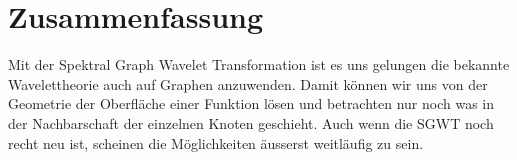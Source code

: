 
\section{Zusammenfassung\label{sec:sgwt:summary}}

Mit der Spektral Graph Wavelet Transformation ist es uns gelungen die bekannte 
Wavelettheorie auch auf Graphen anzuwenden. Damit k\"onnen wir uns von der 
Geometrie der Oberfl\"ache einer Funktion l\"osen und betrachten nur noch was 
in der Nachbarschaft der einzelnen Knoten geschieht. Auch wenn die SGWT noch 
recht neu ist, scheinen die M\"oglichkeiten \"ausserst weitl\"aufig zu sein.

